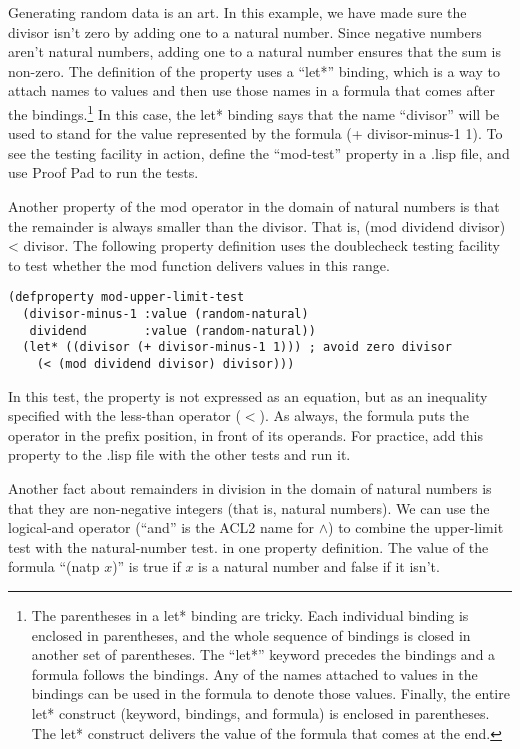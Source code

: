 Generating random data is an art.
In this example, we have made sure the divisor isn't zero
by adding one to a natural number. 
Since negative numbers aren't natural numbers, adding one
to a natural number ensures that the sum is non-zero.
\label{let-example-brief-explain}
The definition of the property uses a ``let*'' binding,
which is a way to attach names to values
and then use those names in a formula that comes after the bindings.\footnote{The 
parentheses in a let* binding 
are tricky. Each individual binding is enclosed in parentheses,
and the whole sequence of bindings is closed in another set
of parentheses. The ``let*'' keyword precedes the bindings
and a formula follows the bindings.
Any of the names attached to values in the bindings
can be used in the formula to denote those values.
Finally, the entire let* construct (keyword, bindings, and formula)
is enclosed in parentheses.
The let* construct delivers the value of the formula
that comes at the end.
}
In this case, the let* binding says that
the name ``divisor'' will be used to stand for 
the value represented by the formula (+ divisor-minus-1 1).
To see the testing facility in action,
define the ``mod-test'' property in a .lisp file,
and use Proof Pad to run the tests.

Another property of the mod operator
in the domain of natural numbers 
is that the remainder
is always smaller than the divisor.
That is, (mod dividend divisor) < divisor.
The following property definition uses
the doublecheck testing facility
to test whether the mod function delivers values in this range.

\begin{Verbatim}
(defproperty mod-upper-limit-test
  (divisor-minus-1 :value (random-natural)
   dividend        :value (random-natural))
  (let* ((divisor (+ divisor-minus-1 1))) ; avoid zero divisor
    (< (mod dividend divisor) divisor)))
\end{Verbatim}

In this test, the property is not expressed as an equation,
but as an inequality
specified with the less-than operator ($<$).
As always, the formula puts the operator in the prefix position,
in front of its operands.
For practice, add this property to the .lisp file with the other tests and run it.

Another fact about remainders in division in the domain of natural numbers is that
they are non-negative integers (that is, natural numbers).
We can use the logical-and operator (``and'' is the ACL2 name for $\wedge$)
to combine the upper-limit test with the natural-number test.
in one property definition.
\label{natp-op}
The value of the formula ``(natp $x$)'' is true
if $x$ is a natural number and false if it isn't.

